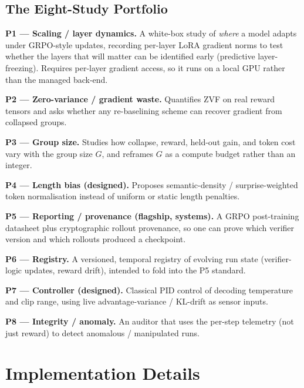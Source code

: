 \documentclass[12pt,a4paper]{report}
\begin{document}
\section{The Eight-Study Portfolio}
\label{sec:portfolio}

\textbf{P1 --- Scaling / layer dynamics.} A white-box study of \emph{where} a model
adapts under GRPO-style updates, recording per-layer LoRA gradient norms to test
whether the layers that will matter can be identified early (predictive
layer-freezing). Requires per-layer gradient access, so it runs on a local GPU
rather than the managed back-end.

\textbf{P2 --- Zero-variance / gradient waste.} Quantifies ZVF on real reward
tensors and asks whether any re-baselining scheme can recover gradient from
collapsed groups.

\textbf{P3 --- Group size.} Studies how collapse, reward, held-out gain, and token
cost vary with the group size $G$, and reframes $G$ as a compute budget rather than
an integer.

\textbf{P4 --- Length bias (designed).} Proposes semantic-density /
surprise-weighted token normalisation instead of uniform or static length penalties.

\textbf{P5 --- Reporting / provenance (flagship, systems).} A GRPO post-training
datasheet plus cryptographic rollout provenance, so one can prove which verifier
version and which rollouts produced a checkpoint.


\textbf{P6 --- Registry.} A versioned, temporal registry of evolving run state
(verifier-logic updates, reward drift), intended to fold into the P5 standard.

\textbf{P7 --- Controller (designed).} Classical PID control of decoding temperature
and clip range, using live advantage-variance / KL-drift as sensor inputs.

\textbf{P8 --- Integrity / anomaly.} An auditor that uses the per-step telemetry
(not just reward) to detect anomalous / manipulated runs.

\chapter{Implementation Details}
\label{ch:impl}
\end{document}

